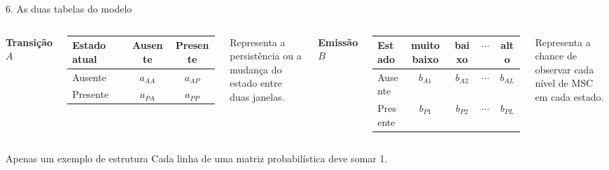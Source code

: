 \documentclass{beamer}
\begin{document}
\begin{frame}{6. As duas tabelas do modelo}
\large
\begin{columns}[T]
\textbf{Transi\c{c}\~ao $A$}\\[0.15cm]
\scriptsize
\begin{tabular}{lcc}
\toprule
Estado atual & Ausente & Presente \\
\midrule
Ausente  & $a_{AA}$ & $a_{AP}$ \\
Presente & $a_{PA}$ & $a_{PP}$ \\
\bottomrule
\end{tabular}

\vspace{0.25cm}
\normalsize
Representa a persist\^encia ou a mudan\c{c}a do estado entre duas janelas.

\textbf{Emiss\~ao $B$}\\[0.15cm]
\scriptsize
\begin{tabular}{lcccc}
\toprule
Estado & muito baixo & baixo & $\cdots$ & alto \\
\midrule
Ausente  & $b_{A1}$ & $b_{A2}$ & $\cdots$ & $b_{AL}$ \\
Presente & $b_{P1}$ & $b_{P2}$ & $\cdots$ & $b_{PL}$ \\
\bottomrule
\end{tabular}

\vspace{0.25cm}
\normalsize
Representa a chance de observar cada n\'ivel de MSC em cada estado.
\end{columns}

\vspace{0.45cm}
\begin{alertblock}{Apenas um exemplo de estrutura}
Cada linha de uma matriz probabil\'istica deve somar 1.
\end{alertblock}
\end{frame}
\end{document}

